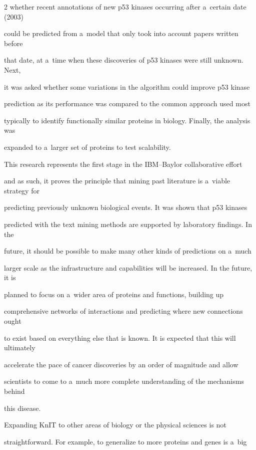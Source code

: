 \begin{multicols}{2}
whether recent annotations of new p53 kinases occurring after a~certain date (2003)


could be predicted from a~model that only took into account papers written before


that date, at a~time when these discoveries of p53 kinases were still unknown. Next,


it was asked whether some variations in the algorithm could improve p53 kinase


prediction as  its performance  was compared to the common approach used most


typically to identify functionally similar proteins in biology. Finally, the analysis was


expanded to a~larger set of proteins to test scalability.





  This research represents the first stage in the IBM--Baylor collaborative effort


and as such, it proves the principle that mining past literature is a~viable strategy for


predicting previously unknown biological events. It was shown that p53 kinases


predicted with the text mining methods are supported by laboratory findings. In the


future, it should be possible to make many other kinds of predictions on a~much


larger scale as the infrastructure and capabilities will be increased. In the future, it is


planned to focus on a~wider area of proteins and functions, building up


comprehensive networks of interactions and predicting where new connections ought


to exist based on everything else that is known. It is expected that  this will ultimately


accelerate the pace of cancer discoveries by an order of magnitude and allow


scientists to come to a~much more complete understanding of the mechanisms behind


this disease.





  Expanding KnIT to other areas of biology or the physical sciences is not


straightforward. For example, to generalize to more proteins and genes is a~big



\end{multicols}
